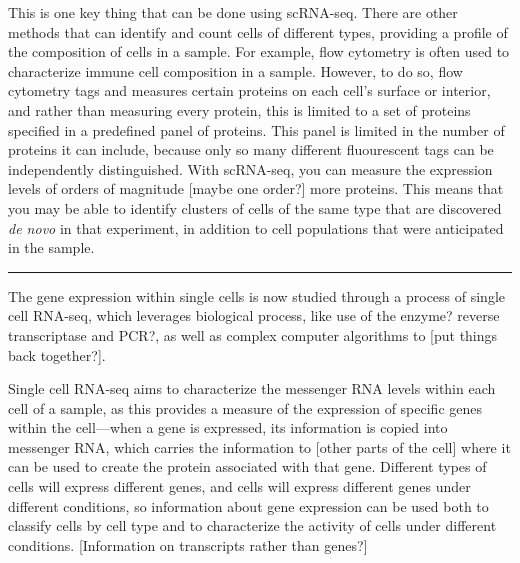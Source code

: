 \documentclass[
]{book}
\begin{document}
This is one key thing that can be done using scRNA-seq. There are other
methods that can identify and count cells of different types, providing
a profile of the composition of cells in a sample. For example, flow
cytometry is often used to characterize immune cell composition in a
sample. However, to do so, flow cytometry tags and measures certain
proteins on each cell's surface or interior, and rather than measuring
every protein, this is limited to a set of proteins specified in a
predefined panel of proteins. This panel is limited in the number of
proteins it can include, because only so many different fluourescent
tags can be independently distinguished. With scRNA-seq, you can measure
the expression levels of orders of magnitude {[}maybe one order?{]} more
proteins. This means that you may be able to identify clusters of cells
of the same type that are discovered \emph{de novo} in that experiment, in
addition to cell populations that were anticipated in the sample.

\begin{center}\rule{0.5\linewidth}{0.5pt}\end{center}

The gene expression within single cells is now studied through a process of
single cell RNA-seq, which leverages biological process, like use of the enzyme?
reverse transcriptase and PCR?, as well as complex computer algorithms to {[}put
things back together?{]}.

Single cell RNA-seq aims to characterize the messenger RNA levels within
each cell of a sample, as this provides a measure of the expression of
specific genes within the cell---when a gene is expressed, its
information is copied into messenger RNA, which carries the information
to {[}other parts of the cell{]} where it can be used to create the protein
associated with that gene. Different types of cells will express different
genes, and cells will express different genes under different conditions,
so information about gene expression can be used both to classify cells
by cell type and to characterize the activity of cells under different
conditions. {[}Information on transcripts rather than genes?{]}
\end{document}
